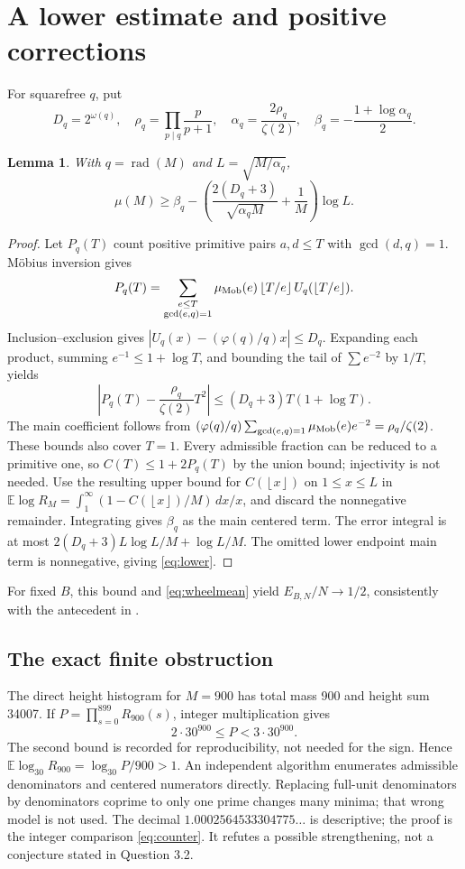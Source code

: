 \documentclass[11pt]{article}
\newtheorem{lemma}[theorem]{Lemma}
\theoremstyle{definition}\newtheorem{definition}[theorem]{Definition}
\theoremstyle{remark}\newtheorem{remark}[theorem]{Remark}
\newcommand{\E}{\mathbb E}
\newcommand{\rad}{\operatorname{rad}}
\newcommand{\floor}[1]{\left\lfloor #1\right\rfloor}
\begin{document}
\section{A lower estimate and positive corrections}
For squarefree \(q\), put
\[
 D_q=2^{\omega(q)},\quad
 \rho_q=\prod_{p\mid q}\frac p{p+1},\quad
 \alpha_q=\frac{2\rho_q}{\zeta(2)},\quad
 \beta_q=-\frac{1+\log\alpha_q}{2}.
\]

\begin{lemma}\label{lem:lower}
With \(q=\rad(M)\) and \(L=\sqrt{M/\alpha_q}\),
\[
 \mu(M)\ge
 \beta_q-
 \left(\frac{2(D_q+3)}{\sqrt{\alpha_q M}}+\frac1M\right)\log L.
                                                               \tag{6.1}\label{eq:lower}
\]
\end{lemma}
\begin{proof}
Let \(P_q(T)\) count positive primitive pairs \(a,d\le T\) with
\(\gcd(d,q)=1\). Möbius inversion gives
\[
 P_q(T)=\sum_{\substack{e\le T\\\gcd(e,q)=1}}
       \mu_{\rm Mob}(e)\floor{T/e}U_q(\floor{T/e}).
\]
Inclusion--exclusion gives \(|U_q(x)-(\varphi(q)/q)x|\le D_q\).
Expanding each product, summing \(e^{-1}\le1+\log T\), and bounding
the tail of \(\sum e^{-2}\) by \(1/T\), yields
\[
 \left|P_q(T)-\frac{\rho_q}{\zeta(2)}T^2\right|
       \le(D_q+3)T(1+\log T).                       \tag{6.2}
\]
The main coefficient follows from
\((\varphi(q)/q)\sum_{\gcd(e,q)=1}\mu_{\rm Mob}(e)e^{-2}
=\rho_q/\zeta(2)\). These bounds also cover \(T=1\).
Every admissible fraction can be reduced to a primitive one, so
\(C(T)\le1+2P_q(T)\) by the union bound; injectivity is not needed.
Use the resulting upper bound for \(C(\floor x)\) on \(1\le x\le L\)
in \(\E\log R_M=\int_1^\infty(1-C(\floor x)/M)\,dx/x\), and discard
the nonnegative remainder. Integrating gives \(\beta_q\) as the main
centered term. The error integral is at most
\(2(D_q+3)L\log L/M+\log L/M\).
The omitted lower endpoint main term is nonnegative, giving
\eqref{eq:lower}.
\end{proof}
For fixed \(B\), this bound and \eqref{eq:wheelmean} yield
\(E_{B,N}/N\to1/2\), consistently with the antecedent in \cite{GK}.

\subsection{The exact finite obstruction}
The direct height histogram for \(M=900\) has total mass 900 and height
sum 34007. If
\(P=\prod_{s=0}^{899}R_{900}(s)\), integer multiplication gives
\[
             2\cdot30^{900}\le P<3\cdot30^{900}.     \tag{6.3}\label{eq:counter}
\]
The second bound is recorded for reproducibility, not needed for the sign.
Hence \(\E\log_{30}R_{900}=\log_{30}P/900>1\).
An independent algorithm enumerates admissible denominators and centered
numerators directly. Replacing full-unit denominators by denominators
coprime to only one prime changes many minima; that wrong model is not
used. The decimal \(1.0002564533304775\ldots\) is descriptive;
the proof is the integer comparison \eqref{eq:counter}.
It refutes a possible strengthening, not a conjecture stated in
Question 3.2.
\end{document}
